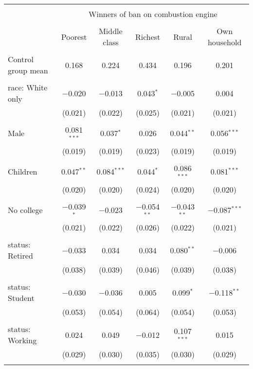 
\begin{tabular}{@{\extracolsep{5pt}}lccccc} 
\\[-1.8ex]\hline 
\hline \\[-1.8ex] 
 & \multicolumn{5}{c}{Winners of ban on combustion engine} \\ 
\cline{2-6} 
\\[-1.8ex] & Poorest & Middle class & Richest & Rural & Own household \\ 
\hline \\[-1.8ex] 
 Control group mean & 0.168 & 0.224 & 0.434 & 0.196 & 0.201  \\ \hline \\[-1.8ex] race: White only & $-$0.020 & $-$0.013 & 0.043$^{*}$ & $-$0.005 & 0.004 \\ 
  & (0.021) & (0.022) & (0.025) & (0.021) & (0.021) \\ 
  & & & & & \\ 
 Male & 0.081$^{***}$ & 0.037$^{*}$ & 0.026 & 0.044$^{**}$ & 0.056$^{***}$ \\ 
  & (0.019) & (0.019) & (0.023) & (0.019) & (0.019) \\ 
  & & & & & \\ 
 Children & 0.047$^{**}$ & 0.084$^{***}$ & 0.044$^{*}$ & 0.086$^{***}$ & 0.081$^{***}$ \\ 
  & (0.020) & (0.020) & (0.024) & (0.020) & (0.020) \\ 
  & & & & & \\ 
 No college & $-$0.039$^{*}$ & $-$0.023 & $-$0.054$^{**}$ & $-$0.043$^{**}$ & $-$0.087$^{***}$ \\ 
  & (0.021) & (0.022) & (0.026) & (0.022) & (0.021) \\ 
  & & & & & \\ 
 status: Retired & $-$0.033 & 0.034 & 0.034 & 0.080$^{**}$ & $-$0.006 \\ 
  & (0.038) & (0.039) & (0.046) & (0.039) & (0.038) \\ 
  & & & & & \\ 
 status: Student & $-$0.030 & $-$0.036 & 0.005 & 0.099$^{*}$ & $-$0.118$^{**}$ \\ 
  & (0.053) & (0.054) & (0.064) & (0.054) & (0.053) \\ 
  & & & & & \\ 
 status: Working & 0.024 & 0.049 & $-$0.012 & 0.107$^{***}$ & 0.015 \\ 
  & (0.029) & (0.030) & (0.035) & (0.030) & (0.029) \\ 
  & & & & & \\ 

\end{tabular}
